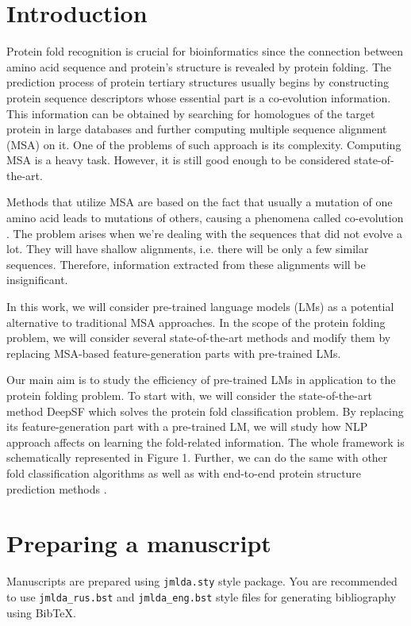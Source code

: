 \documentclass[12pt, twoside]{article}
\begin{document}
\section{Introduction}
\noindent %
Protein fold recognition is crucial for bioinformatics since the connection between amino acid sequence and protein’s structure is revealed by protein folding. The prediction process of protein tertiary structures usually begins by constructing protein sequence descriptors whose essential part is a co-evolution information. This information can be obtained by searching for homologues of the target protein in large databases and further computing multiple sequence alignment (MSA) on it. One of the problems of such approach is its complexity. Computing MSA is a heavy task. However, it is still good enough to be considered state-of-the-art.

Methods that utilize MSA are based on the fact that usually a mutation of one amino acid leads to mutations of others, causing a phenomena called co-evolution \cite{co-evolution}. The problem arises when we’re dealing with the sequences that did not evolve a lot. They will have shallow alignments, i.e. there will be only a few similar sequences. Therefore, information extracted from these alignments will be insignificant. 

In this work, we will consider pre-trained language models (LMs) \cite{Elnaggar} as a potential alternative to traditional MSA approaches.  In the scope of the protein folding problem, we will  consider  several  state-of-the-art  methods  and  modify  them  by  replacing  MSA-based feature-generation parts with pre-trained LMs.

Our main aim is to study the efficiency of pre-trained LMs in application to the protein folding problem.  To start with, we will consider the state-of-the-art method DeepSF \cite{DeepSF} which solves the protein fold classification problem.  By replacing its feature-generation part with a pre-trained LM, we will study how NLP approach affects on learning the fold-related information.  The whole framework is schematically represented in Figure 1. Further, we can do the same with other fold classification algorithms\cite{Villegas, DeepFrag} as well as with end-to-end protein structure prediction methods \cite{Kandathil, Xu2020.10.12.336859}.


\section{Preparing a manuscript}
\noindent
Manuscripts are prepared using \verb'jmlda.sty' style package.
You are recommended to use \verb'jmlda_rus.bst' and \verb'jmlda_eng.bst' style files for generating bibliography using Bib\TeX.
\end{document}
